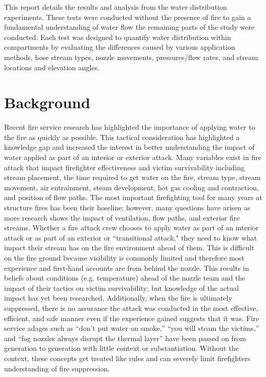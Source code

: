\documentclass{book}
\begin{document}
This report details the results and analysis from the water distribution experiments. These tests were conducted without the presence of fire to gain a fundamental understanding of water flow the remaining parts of the study were conducted. Each test was designed to quantify water distribution within compartments by evaluating the differences caused by various application methods, hose stream types, nozzle movements, pressures/flow rates, and stream locations and elevation angles. 


\chapter{Background}

Recent fire service research has highlighted the importance of applying water to the fire as quickly as possible. This tactical consideration has highlighted a knowledge gap and increased the interest in better understanding the impact of water applied as part of an interior or exterior attack. Many variables exist in fire attack that impact firefighter effectiveness and victim survivability including stream placement, the time required to get water on the fire, stream type, stream movement, air entrainment, steam development, hot gas cooling and contraction, and position of flow paths. The most important firefighting tool for many years at structure fires has been their hoseline; however, many questions have arisen as more research shows the impact of ventilation, flow paths, and exterior fire streams. Whether a fire attack crew chooses to apply water as part of an interior attack or as part of an exterior or ``transitional attack," they need to know what impact their stream has on the fire environment ahead of them. This is difficult on the fire ground because visibility is commonly limited and therefore most experience and first-hand accounts are from behind the nozzle. This results in beliefs about conditions (e.g. temperature) ahead of the nozzle team and the impact of their tactics on victim survivability; but knowledge of the actual impact has yet been researched. Additionally, when the fire is ultimately suppressed, there is no assurance the attack was conducted in the most effective, efficient, and safe manner even if the experience gained suggests that it was. Fire service adages such as ``don’t put water on smoke,'' ``you will steam the victims,'' and ``fog nozzles always disrupt the thermal layer'' have been passed on from generation to generation with little context or substantiation. Without the context, these concepts get treated like rules and can severely limit firefighters understanding of fire suppression.
\end{document}
